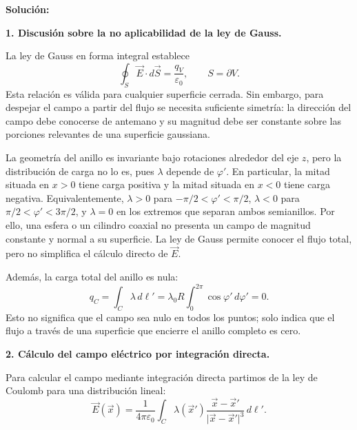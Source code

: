 \documentclass[11pt]{article}
\begin{document}
\textbf{Solución:}

\textbf{1. Discusión sobre la no aplicabilidad de la ley de Gauss.}\par
La ley de Gauss en forma integral establece
\begin{equation}
\oint_{S}\vec E\cdot d\vec S=\frac{q_V}{\varepsilon_0},
\qquad S=\partial V.
\label{eq:gauss}
\end{equation}
Esta relación es válida para cualquier superficie cerrada. Sin embargo, para
despejar el campo a partir del flujo se necesita suficiente simetría: la dirección
del campo debe conocerse de antemano y su magnitud debe ser constante sobre las
porciones relevantes de una superficie gaussiana.

La geometría del anillo es invariante bajo rotaciones alrededor del eje $z$, pero
la distribución de carga no lo es, pues $\lambda$ depende de $\varphi'$. En
particular, la mitad situada en $x>0$ tiene carga positiva y la mitad situada en
$x<0$ tiene carga negativa. Equivalentemente, $\lambda>0$ para
$-\pi/2<\varphi'<\pi/2$, $\lambda<0$ para
$\pi/2<\varphi'<3\pi/2$, y $\lambda=0$ en los extremos que separan ambos
semianillos. Por ello, una esfera o un cilindro coaxial no presenta
un campo de magnitud constante y normal a su superficie. La ley de Gauss permite
conocer el flujo total, pero no simplifica el cálculo directo de $\vec E$.

Además, la carga total del anillo es nula:
\[
q_C=\int_C\lambda\,d\ell'
=\lambda_0R\int_0^{2\pi}\cos\varphi'\,d\varphi'=0.
\]
Esto no significa que el campo sea nulo en todos los puntos; solo indica que el
flujo a través de una superficie que encierre el anillo completo es cero.

\textbf{2. Cálculo del campo eléctrico por integración directa.}\par
Para calcular el campo mediante integración directa partimos de la ley de
Coulomb para una distribución lineal:
\begin{equation}
\vec E(\vec x)=\frac{1}{4\pi\varepsilon_0}
\int_C\lambda(\vec x')
\frac{\vec x-\vec x'}{\lvert\vec x-\vec x'\rvert^3}\,d\ell'.
\label{eq:coulomb}
\end{equation}
\end{document}
